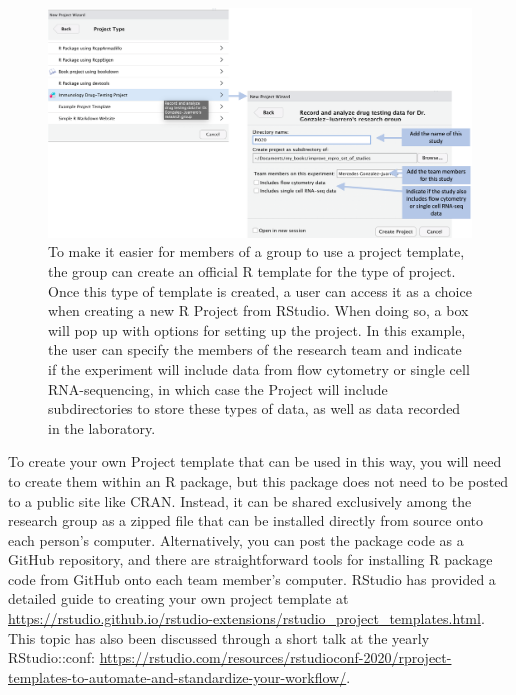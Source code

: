 \documentclass[]{tufte-book}
\begin{document}
\begin{figure}
\includegraphics[width=\textwidth]{figures/project_example_project_template} \caption[To make it easier for members of a group to use a project template, the group can create an official R template for the type of project]{To make it easier for members of a group to use a project template, the group can create an official R template for the type of project. Once this type of template is created, a user can access it as a choice when creating a new R Project from RStudio. When doing so, a box will pop up with options for setting up the project. In this example, the user can specify the members of the research team and indicate if the experiment will include data from flow cytometry or single cell RNA-sequencing, in which case the Project will include subdirectories to store these types of data, as well as data recorded in the laboratory.}\label{fig:exampleprojectwizard}
\end{figure}

To create your own Project template that can be used in this way, you will need to
create them within an R package, but this package does not need to be posted to
a public site like CRAN. Instead, it can be shared exclusively among the
research group as a zipped file that can be installed directly from source onto
each person's computer. Alternatively, you can post the package code as a GitHub
repository, and there are straightforward tools for installing R package code
from GitHub onto each team member's computer. RStudio has provided a
detailed guide to creating your own project template at
\url{https://rstudio.github.io/rstudio-extensions/rstudio_project_templates.html}.
This topic has also been discussed through a short talk at the
yearly RStudio::conf: \url{https://rstudio.com/resources/rstudioconf-2020/rproject-templates-to-automate-and-standardize-your-workflow/}.
\end{document}
